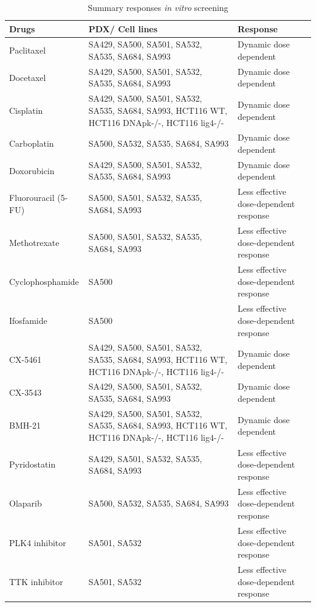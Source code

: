 \begin{table}[htbp]
  \centering
  \caption{Summary responses \textit{in vitro} screening}
    \begin{tabular}{llp{10em}}
    \hline
    \textbf{Drugs} & \textbf{PDX/ Cell lines } & \multicolumn{1}{l}{\textbf{Response}} \\
    \hline
    Paclitaxel & \multicolumn{1}{p{12.915em}}{SA429, SA500, SA501, SA532, SA535, SA684, SA993} & Dynamic dose dependent \\
    Docetaxel & \multicolumn{1}{p{12.915em}}{SA429, SA500, SA501, SA532, SA535, SA684, SA993} & Dynamic dose dependent \\
    Cisplatin & \multicolumn{1}{p{12.915em}}{SA429, SA500, SA501, SA532, SA535, SA684, SA993, HCT116 WT, HCT116 DNApk-/-, HCT116 lig4-/-} & Dynamic dose dependent \\
    Carboplatin & \multicolumn{1}{p{12.915em}}{SA500, SA532, SA535, SA684, SA993} & Dynamic dose dependent \\
    Doxorubicin & \multicolumn{1}{p{12.915em}}{SA429, SA500, SA501, SA532, SA535, SA684, SA993} & Dynamic dose dependent \\
    Fluorouracil (5-FU) & \multicolumn{1}{p{12.915em}}{SA500, SA501, SA532, SA535, SA684, SA993} & Less effective dose-dependent response \\
    Methotrexate & \multicolumn{1}{p{12.915em}}{SA500, SA501, SA532, SA535, SA684, SA993} & Less effective dose-dependent response \\
    Cyclophosphamide & SA500 & Less effective dose-dependent response \\
    Ifosfamide & SA500 & Less effective dose-dependent response \\
    CX-5461 & \multicolumn{1}{p{12.915em}}{SA429, SA500, SA501, SA532, SA535, SA684, SA993, HCT116 WT, HCT116 DNApk-/-, HCT116 lig4-/-} & Dynamic dose dependent \\
    CX-3543 & \multicolumn{1}{p{12.915em}}{SA429, SA500, SA501, SA532, SA535, SA684, SA993} & Dynamic dose dependent \\
    BMH-21 & \multicolumn{1}{p{12.915em}}{SA429, SA500, SA501, SA532, SA535, SA684, SA993, HCT116 WT, HCT116 DNApk-/-, HCT116 lig4-/-} & Dynamic dose dependent \\
    Pyridostatin & \multicolumn{1}{p{12.915em}}{SA429, SA501, SA532, SA535, SA684, SA993} & Less effective dose-dependent response \\
    Olaparib & \multicolumn{1}{p{12.915em}}{SA500, SA532, SA535, SA684, SA993} & Less effective dose-dependent response \\
    PLK4 inhibitor & SA501, SA532 & Less effective dose-dependent response \\
    TTK inhibitor & SA501, SA532 & Less effective dose-dependent response \\
    \hline
    \end{tabular}%
      \label{tab:summaryresponsesinvitro}%
\end{table}%



